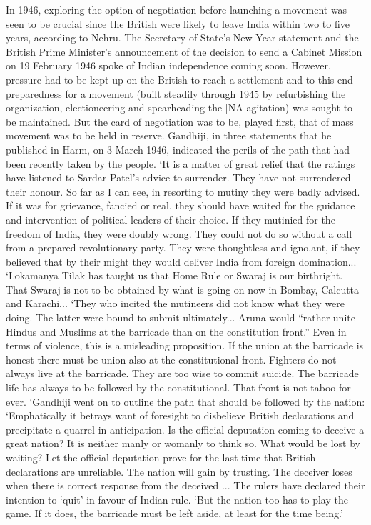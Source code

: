 In 1946, exploring the option of negotiation before launching a movement was seen to be crucial since the British were likely to leave India within two to five years, according to Nehru. The Secretary of State's New Year statement and the British Prime Minister's announcement of the decision to send a Cabinet Mission on 19 February 1946 spoke of Indian independence coming soon. However, pressure had to be kept up on the British to reach a settlement and to this end preparedness for a movement (built steadily through 1945 by refurbishing the organization, electioneering and spearheading the [NA agitation) was sought to be maintained. But the card of negotiation was to be, played first, that of mass movement was to be held in reserve. Gandhiji, in three statements that he published in Harm, on 3 March 1946, indicated the perils of the path that had been recently taken by the people. `It is a matter of great relief that the ratings have listened to Sardar Patel's advice to surrender. They have not surrendered their honour. So far as I can see, in resorting to mutiny they were badly advised. If it was for grievance, fancied or real, they should have waited for the guidance and intervention of political leaders of their choice. If they mutinied for the freedom of India, they were doubly wrong. They could not do so without a call from a prepared revolutionary party. They were thoughtless and igno.ant, if they believed that by their might they would deliver India from foreign domination... `Lokamanya Tilak has taught us that Home Rule or Swaraj is our birthright. That Swaraj is not to be obtained by what is going on now in Bombay, Calcutta and Karachi... `They who incited the mutineers did not know what they were doing. The latter were bound to submit ultimately... Aruna would ``rather unite Hindus and Muslims at the barricade than on the constitution front.'' Even in terms of violence, this is a misleading proposition. If the union at the barricade is honest there must be union also at the constitutional front. Fighters do not always live at the barricade. They are too wise to commit suicide. The barricade life has always to be followed by the constitutional. That front is not taboo for ever. `Gandhiji went on to outline the path that should be followed by the nation: `Emphatically it betrays want of foresight to disbelieve British declarations and precipitate a quarrel in anticipation. Is the official deputation coming to deceive a great nation? It is neither manly or womanly to think so. What would be lost by waiting? Let the official deputation prove for the last time that British declarations are unreliable. The nation will gain by trusting. The deceiver loses when there is correct response from the deceived ... The rulers have declared their intention to `quit' in favour of Indian rule. `But the nation too has to play the game. If it does, the barricade must be left aside, at least for the time being.'
